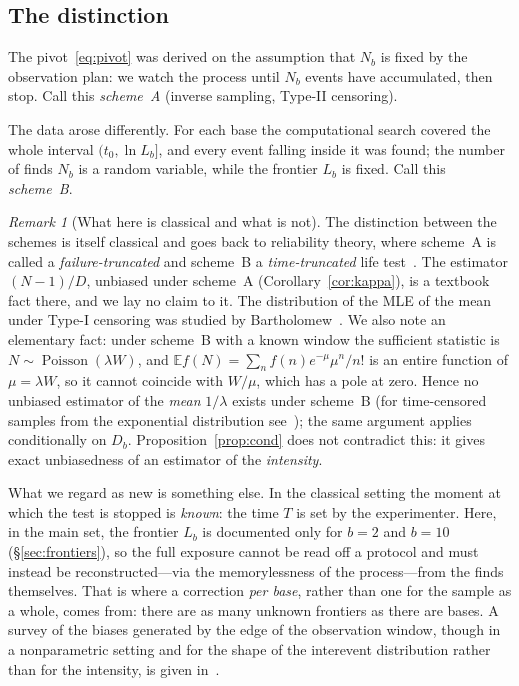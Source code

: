 \documentclass[11pt,a4paper]{article}
\theoremstyle{plain}
\theoremstyle{remark}
\newtheorem{remark}{Remark}
\DeclareMathOperator{\Pois}{Poisson}
\begin{document}
\subsection{The distinction}

The pivot~\eqref{eq:pivot} was derived on the assumption that $N_b$ is fixed by
the observation plan: we watch the process until $N_b$ events have accumulated,
then stop. Call this \emph{scheme~A} (inverse sampling, Type-II censoring).

The data arose differently. For each base the computational search covered the
whole interval $(t_0,\ln L_b]$, and every event falling inside it was found; the
number of finds $N_b$ is a random variable, while the frontier $L_b$ is fixed.
Call this \emph{scheme~B}.

\begin{remark}[What here is classical and what is not]\label{rem:priority}
The distinction between the schemes is itself classical and goes back to
reliability theory, where scheme~A is called a \emph{failure-truncated} and
scheme~B a \emph{time-truncated} life test~\cite{epstein1954trunc,epsteinsobel1954}. The estimator $(N-1)/D$, unbiased under scheme~A
(Corollary~\ref{cor:kappa}), is a textbook fact there, and we lay no claim to
it. The distribution of the MLE of the mean under Type-I censoring was studied
by Bartholomew~\cite{bartholomew1963}. We also note an elementary fact: under
scheme~B with a known window the sufficient statistic is
$N\sim\Pois(\lambda W)$, and $\mathbb E f(N)=\sum_nf(n)e^{-\mu}\mu^n/n!$ is an
entire function of $\mu=\lambda W$, so it cannot coincide with $W/\mu$, which has
a pole at zero. Hence no unbiased estimator of the \emph{mean} $1/\lambda$ exists
under scheme~B (for time-censored samples from the exponential distribution
see~\cite{sengupta2009}); the same argument applies conditionally on $D_b$.
Proposition~\ref{prop:cond} does not contradict this: it gives exact
unbiasedness of an estimator of the \emph{intensity}.

What we regard as new is something else. In the classical setting the moment at
which the test is stopped is \emph{known}: the time $T$ is set by the
experimenter. Here, in the main set, the frontier $L_b$ is documented only for
$b=2$ and $b=10$ (\S\ref{sec:frontiers}), so the full exposure cannot be read off a protocol and
must instead be reconstructed---via the memorylessness of the process---from the
finds themselves. That is where a correction \emph{per base}, rather than one for
the sample as a whole, comes from: there are as many unknown frontiers as there
are bases. A survey of the biases generated by the edge of the observation
window, though in a nonparametric setting and for the shape of the interevent
distribution rather than for the intensity, is given in~\cite{kivela2015}.


\end{remark}
\end{document}
